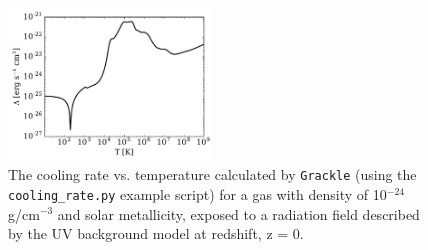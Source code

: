 \documentclass[11pt]{article}
\newcommand{\grackle}{\texttt{Grackle}}
\begin{document}
\begin{flushleft}

\begin{figure}
\begin{center}
\includegraphics[width=0.48\textwidth]{figures/cooling_rate.pdf}
\caption{The cooling rate vs. temperature calculated by \grackle{}
  (using the \texttt{cooling\_rate.py} example script) for
  a gas with density of 10$^{-24}$ g/cm$^{-3}$ and solar metallicity,
  exposed to a radiation field described by the \citet{2012ApJ...746..125H} UV
  background model at redshift, z = 0.}
\label{fig:cooling-rate}
\end{center}
\vspace*{-1\baselineskip}
\end{figure}


\end{flushleft}
\end{document}
